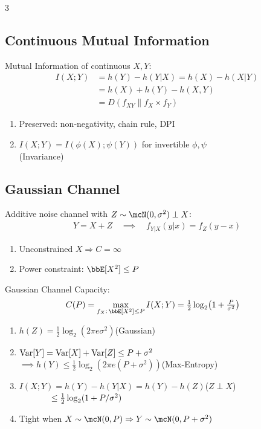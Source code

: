 \documentclass[12pt, a4paper]{article}
\begin{document}
\begin{multicols*}{3}
\subsection{Continuous Mutual Information}
Mutual Information of continuous $X,Y$:
\begin{align*}
  I(X;Y)&=h(Y)-h(Y|X)=h(X)-h(X|Y)\\
        &= h(X) + h(Y) - h(X,Y)\\
        &=D(f_{XY}\|f_X\times f_Y)
\end{align*}
\begin{enumerate}[\roman*.]
  \item Preserved: non-negativity, chain rule, DPI
  \item $I(X;Y)=I(\phi(X);\psi(Y))$ for invertible $\phi,\psi$\\\hfill(Invariance)
\end{enumerate}
\colbreak
\subsection{Gaussian Channel}
Additive noise channel with $Z\sim\mcN(0,\sigma^2)\perp X$:
\begin{align*}
  Y=X+Z\quad\implies\quad f_{Y|X}(y|x)=f_Z(y-x)
\end{align*}
\begin{enumerate}[\roman*.]
  \item Unconstrained $X\Rightarrow C=\infty$
  \item Power constraint: $\E[X^2]\le P$
\end{enumerate}
 
Gaussian Channel Capacity:
\begin{align*}
  C(P)&=\max_{f_X:\,\E[X^2]\le P}I(X;Y)=\tfrac{1}{2}\log_2\!\left(1+\tfrac{P}{\sigma^2}\right)
\end{align*}
\begin{enumerate}[\roman*.]
  \item $h(Z)=\tfrac{1}{2}\log_2(2\pi e\sigma^2)$\hfill(Gaussian)
  \item $\operatorname{Var}[Y]=\operatorname{Var}[X]+\operatorname{Var}[Z]\le P+\sigma^2$\\$\implies h(Y)\le\tfrac{1}{2}\log_2(2\pi e(P+\sigma^2))$\hfill(Max-Entropy)
  \item $I(X;Y)=h(Y)-h(Y|X)=h(Y)-h(Z)$\hfill($Z\perp X$)\\$\hspace{3.75em}\le\tfrac{1}{2}\log_2(1+P/\sigma^2)$
  \item Tight when $X\sim\mcN(0,P)\Rightarrow Y\sim\mcN(0,P+\sigma^2)$
\end{enumerate}
 

\end{multicols*}
\end{document}
